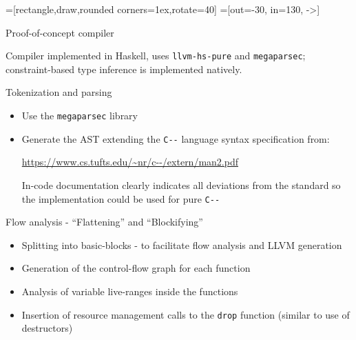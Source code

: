 \documentclass[aspectratio=169]{beamer}
\newcommand{\li}[1]{\lstinline{#1}}
\def\cmm{\texttt{C-\relax-}}
\begin{document}
=[rectangle,draw,rounded corners=1ex,rotate=40]
=[out=-30, in=130, ->]
\begin{frame}{Proof-of-concept compiler}
\centering
{}

Compiler implemented in Haskell, uses \texttt{\color{cyan!80!gray}llvm-hs-pure} and \texttt{\color{orange!80!gray}megaparsec}; \textcolor{green!50!gray}{constraint-based type inference} is implemented natively.
\end{frame}

\begin{frame}{Tokenization and parsing}
  \begin{itemize}
    \item Use the \texttt{\color{orange!80!gray}megaparsec} library
    \item Generate the AST extending the \cmm{} language syntax specification from:
    
    \url{https://www.cs.tufts.edu/~nr/c--/extern/man2.pdf}

    In-code documentation clearly indicates all deviations from the standard so the implementation could be used for pure \cmm{}
  \end{itemize}
\end{frame}

\begin{frame}{Flow analysis - ``Flattening'' and ``Blockifying''}
  \begin{itemize}
    \item Splitting into basic-blocks - to facilitate flow analysis and LLVM generation
    \item Generation of the control-flow graph for each function
    \item Analysis of variable live-ranges inside the functions
    \item Insertion of resource management calls to the \li{drop} function (similar to use of destructors)
  \end{itemize}
\end{frame}
\end{document}
